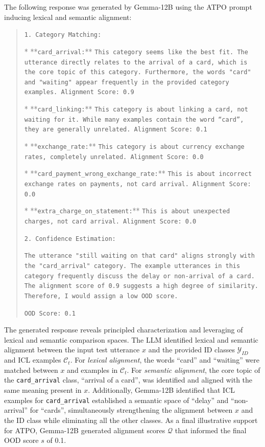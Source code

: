 The following response was generated by Gemma-12B using the ATPO prompt inducing lexical and semantic alignment:
\begin{quote}
\texttt{1. Category Matching:}

*   **\texttt{card\_arrival:}** \texttt{This category seems like the best fit. The utterance directly relates to the arrival of a card, which is the core topic of this category. Furthermore, the words "card" and "waiting" appear frequently in the provided category examples. Alignment Score: 0.9}

*   **\texttt{card\_linking:}** \texttt{This category is about linking a card, not waiting for it. While many examples contain the word ``card'', they are generally unrelated. Alignment Score: 0.1} 

*   **\texttt{exchange\_rate:}** \texttt{This category is about currency exchange rates, completely unrelated. Alignment Score: 0.0}

*   **\texttt{card\_payment\_wrong\_exchange\_rate:}** \texttt{This is about incorrect exchange rates on payments, not card arrival. Alignment Score: 0.0}

*   **\texttt{extra\_charge\_on\_statement:}** \texttt{This is about unexpected charges, not card arrival. Alignment Score: 0.0}

\texttt{2. Confidence Estimation:}

\texttt{The utterance "still waiting on that card" aligns strongly with the "card\_arrival" category. The example utterances in this category frequently discuss the delay or non-arrival of a card. The alignment score of 0.9 suggests a high degree of similarity. Therefore, I would assign a low OOD score.}

\texttt{OOD Score: 0.1}
\end{quote}
The generated response reveals principled characterization and leveraging of lexical and semantic comparison spaces. The LLM identified lexical and semantic alignment between the input test utterance $x$ and the provided ID classes $\mathcal{Y}_{ID}$ and ICL examples $\mathcal{C}_t$. For \textit{lexical alignment}, the words ``card'' and ``waiting'' were matched between $x$ and examples in $\mathcal{C}_t$. For \textit{semantic alignment}, the core topic of the \texttt{card\_arrival} class, ``arrival of a card'', was identified and aligned with the same meaning present in $x$. Additionally, Gemma-12B identified that ICL examples for \texttt{card\_arrival} established a semantic space of ``delay'' and ``non-arrival'' for ``cards'', simultaneously strengthening the alignment between $x$ and the ID class while eliminating all the other classes. As a final illustrative support for ATPO, Gemma-12B generated alignment scores $\mathcal{Q}$ that informed the final OOD score $s$ of 0.1.

